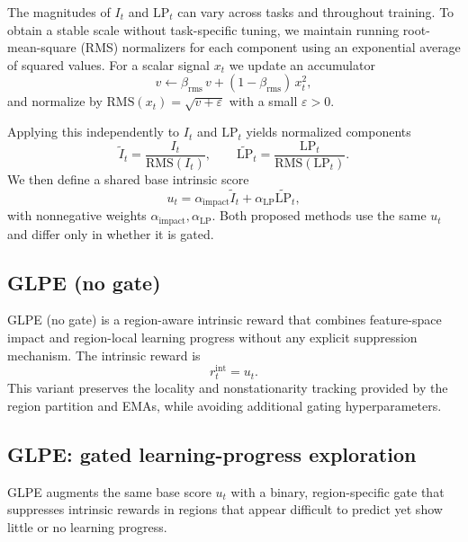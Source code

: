 The magnitudes of $I_t$ and $\mathrm{LP}_t$ can vary across tasks and throughout training.
To obtain a stable scale without task-specific tuning, we maintain running root-mean-square (RMS) normalizers for each component using an exponential average of squared values.
For a scalar signal $x_t$ we update an accumulator
\begin{equation}
    v \leftarrow \beta_{\mathrm{rms}}\,v + (1-\beta_{\mathrm{rms}})\,x_t^2,
\end{equation}
and normalize by $\mathrm{RMS}(x_t)=\sqrt{v+\varepsilon}$ with a small $\varepsilon>0$.

Applying this independently to $I_t$ and $\mathrm{LP}_t$ yields normalized components
\begin{equation}
    \widetilde{I}_t = \frac{I_t}{\mathrm{RMS}(I_t)},\qquad
    \widetilde{\mathrm{LP}}_t = \frac{\mathrm{LP}_t}{\mathrm{RMS}(\mathrm{LP}_t)}.
\end{equation}
We then define a shared base intrinsic score
\begin{equation}
    u_t = \alpha_{\mathrm{impact}}\widetilde{I}_t + \alpha_{\mathrm{LP}}\widetilde{\mathrm{LP}}_t,
\end{equation}
with nonnegative weights $\alpha_{\mathrm{impact}},\alpha_{\mathrm{LP}}$.
Both proposed methods use the same $u_t$ and differ only in whether it is gated.

\subsection{GLPE (no gate)}

GLPE (no gate) is a region-aware intrinsic reward that combines feature-space impact and region-local learning progress without any explicit suppression mechanism.
The intrinsic reward is
\begin{equation}
    r_t^{\mathrm{int}} = u_t.
\end{equation}
This variant preserves the locality and nonstationarity tracking provided by the region partition and EMAs, while avoiding additional gating hyperparameters.

\subsection{GLPE: gated learning-progress exploration}

GLPE augments the same base score $u_t$ with a binary, region-specific gate that suppresses intrinsic rewards in regions that appear difficult to predict yet show little or no learning progress.


